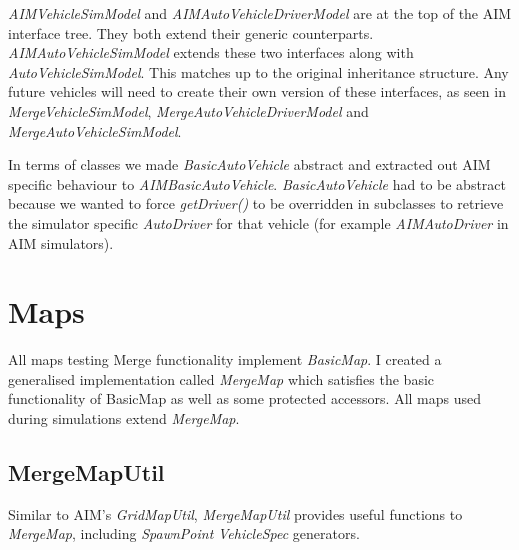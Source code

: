 \begin{appendices}
\emph{AIMVehicleSimModel} and \emph{AIMAutoVehicleDriverModel} are at the top of the AIM interface tree. They both extend their generic counterparts. \emph{AIMAutoVehicleSimModel} extends these two interfaces along with \emph{AutoVehicleSimModel}. This matches up to the original inheritance structure. Any future vehicles will need to create their own version of these interfaces, as seen in \emph{MergeVehicleSimModel}, \emph{MergeAutoVehicleDriverModel} and \emph{MergeAutoVehicleSimModel}. 

In terms of classes we made \emph{BasicAutoVehicle} abstract and extracted out AIM specific behaviour to \emph{AIMBasicAutoVehicle}. \emph{BasicAutoVehicle} had to be abstract because we wanted to force \emph{getDriver()} to be overridden in subclasses to retrieve the simulator specific \emph{AutoDriver} for that vehicle (for example \emph{AIMAutoDriver} in AIM simulators). 

\section{Maps}
\label{sec:Maps}
All maps testing Merge functionality implement \emph{BasicMap}. I created a generalised implementation called \emph{MergeMap} which satisfies the basic functionality of BasicMap as well as some protected accessors. All maps used during simulations extend \emph{MergeMap}.

\subsection{MergeMapUtil}
\label{sec:MergeMapUtil}
Similar to AIM's \emph{GridMapUtil}, \emph{MergeMapUtil} provides useful functions to \emph{MergeMap}, including \emph{SpawnPoint} \emph{VehicleSpec} generators.

\end{appendices}